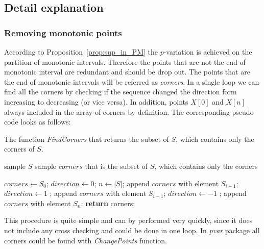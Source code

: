 \documentclass[12pt, a4paper]{article}
\numberwithin{equation}{section}
\begin{document}
  
\subsection{Detail explanation}
\label{sec:DetailExplanation}

\subsubsection{Removing monotonic points}
\label{sec:RemoveMonotonicPoints}

According to Proposition~\ref{prop:sup_in_PM}
the $p$-variation is achieved 
on the partition of monotonic intervals.
Therefore the points that are not 
the end of monotonic interval are redundant 
and should be drop out.
The points that are the end of monotonic intervals
will be referred as \emph{corners}. 
In a single loop we can 
find all the corners by checking if the sequence
changed the direction form increasing to decreasing
(or vice versa). In addition, points $X[0]$ and $X[n]$
always included in the array of corners by definition.
The corresponding pseudo code looks as follows:


\begin{algorithm}[H]
\caption{The function \emph{FindCorners} that
returns the subset of $S$, which contains only the corners of $S$.}
\label{alg:FindCorners}
\begin{algorithmic}[1]
\Input sample $S$
\Output sample $corners$ that is the subset of $S$, which contains only the corners


\State $corners \leftarrow S_0$;
\State $direction \leftarrow 0$;
\State $n \leftarrow |S|$;
      \State append $corners$ with element $S_{i-1}$;
    \EndIf
    \State $direction \leftarrow 1$ ;
  \EndIf
      \State append $corners$ with element $S_{i-1}$;
    \EndIf
    \State $direction \leftarrow -1$ ;
  \EndIf   
\EndFor
\State append $corners$ with element $S_{n}$; 
\State \textbf{return} corners;
\EndFunction
\end{algorithmic}
\end{algorithm}


This procedure is quite simple and
 can by performed very quickly, since it does not include
any cross checking and could be done in one loop.
In \emph{pvar} package all corners could be found with \emph{ChangePoints} function.
\end{document}
